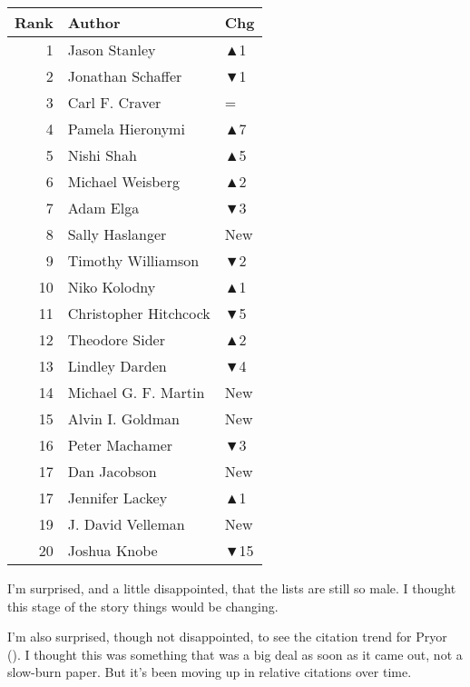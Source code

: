 \documentclass[
  10pt,
  letterpaper,
  DIV=11,
  numbers=noendperiod,
  twoside]{scrartcl}
\begin{document}
\begin{table}
\begin{minipage}{0.33\linewidth}
{\begin{tabular}{rll}
\toprule
Rank & Author & Chg\\
\midrule
1 & Jason Stanley & \textcolor[RGB]{34,178,34}{▲1}\\
2 & Jonathan Schaffer & \textcolor[RGB]{178,34,34}{▼1}\\
3 & Carl F. Craver & =\\
4 & Pamela Hieronymi & \textcolor[RGB]{34,178,34}{▲7}\\
5 & Nishi Shah & \textcolor[RGB]{34,178,34}{▲5}\\
6 & Michael Weisberg & \textcolor[RGB]{34,178,34}{▲2}\\
7 & Adam Elga & \textcolor[RGB]{178,34,34}{▼3}\\
8 & Sally Haslanger & \textcolor[RGB]{34,178,34}{New}\\
9 & Timothy Williamson & \textcolor[RGB]{178,34,34}{▼2}\\
10 & Niko Kolodny & \textcolor[RGB]{34,178,34}{▲1}\\
11 & Christopher Hitchcock & \textcolor[RGB]{178,34,34}{▼5}\\
12 & Theodore Sider & \textcolor[RGB]{34,178,34}{▲2}\\
13 & Lindley Darden & \textcolor[RGB]{178,34,34}{▼4}\\
14 & Michael G. F. Martin & \textcolor[RGB]{34,178,34}{New}\\
15 & Alvin I. Goldman & \textcolor[RGB]{34,178,34}{New}\\
16 & Peter Machamer & \textcolor[RGB]{178,34,34}{▼3}\\
17 & Dan Jacobson & \textcolor[RGB]{34,178,34}{New}\\
17 & Jennifer Lackey & \textcolor[RGB]{34,178,34}{▲1}\\
19 & J. David Velleman & \textcolor[RGB]{34,178,34}{New}\\
20 & Joshua Knobe & \textcolor[RGB]{178,34,34}{▼15}\\
\bottomrule
\end{tabular}

}

\end{minipage}%

\end{table}%

I'm surprised, and a little disappointed, that the lists are still so
male. I thought this stage of the story things would be changing.

I'm also surprised, though not disappointed, to see the citation trend
for Pryor (). I thought this was
something that was a big deal as soon as it came out, not a slow-burn
paper. But it's been moving up in relative citations over time.
\end{document}
